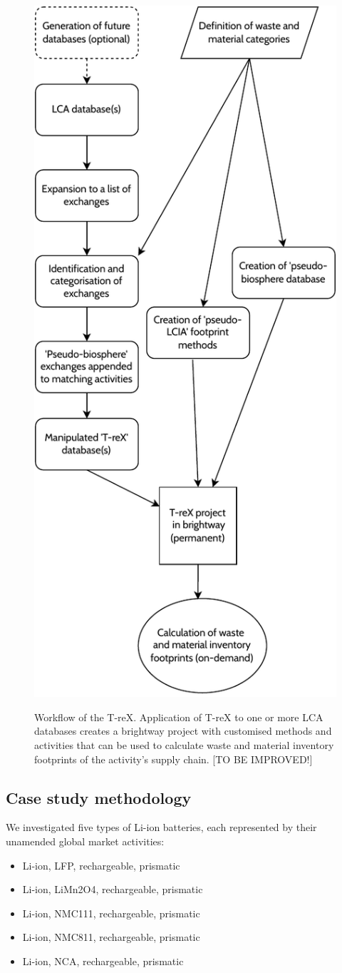 \begin{figure}[H]
    \centering
    \caption{Workflow of the T-reX. Application of T-reX to one or more LCA databases creates a brightway project with customised methods and activities that can be used to calculate waste and material inventory footprints of the activity's supply chain. [TO BE IMPROVED!]}
    \includegraphics[width=0.5\linewidth]{figures/T-reX_method.pdf}
    \label{fig:methods-flowchart}
\end{figure}


\subsection{Case study methodology}\label{sec:method-case_study}

We investigated five types of Li-ion batteries, each represented by their unamended global market activities:
\begin{itemize}[itemsep=0pt]
    \item Li-ion, LFP, rechargeable, prismatic
    \item Li-ion, LiMn2O4, rechargeable, prismatic
    \item Li-ion, NMC111, rechargeable, prismatic
    \item Li-ion, NMC811, rechargeable, prismatic
    \item Li-ion, NCA, rechargeable, prismatic
\end{itemize}

